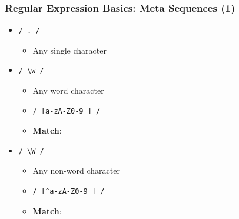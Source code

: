 \documentclass{beamer}
\begin{document}
\begin{frame}[fragile]
    \frametitle{Regular Expression Basics: Meta Sequences (1)}
    \begin{itemize}
        \item \begin{verbatim}/ . /\end{verbatim}
        \begin{itemize}
            \item Any single character
        \end{itemize}
        \item \begin{verbatim}/ \w /\end{verbatim}
        \begin{itemize}
            \item Any word character
            \item \begin{verbatim}/ [a-zA-Z0-9_] /\end{verbatim}
            \item \textbf{Match}: \texttt{\colorbox{blue!50}{}\colorbox{red!90}{\makebox[1em]{\strut}}\colorbox{blue!50}{}\colorbox{red!90}{\makebox[1em]{\strut}}\colorbox{blue!50}{}\colorbox{red!90}{\makebox[1em]{\strut}}\colorbox{red!90}{\makebox{\strut \$!-:;}}}
        \end{itemize}
        \item \begin{verbatim}/ \W /\end{verbatim}
        \begin{itemize}
            \item Any non-word character
            \item \begin{verbatim}/ [^a-zA-Z0-9_] /\end{verbatim}
            \item \textbf{Match}: \texttt{\colorbox{red!90}{}\colorbox{blue!50}{\makebox[1em]{\strut}}\colorbox{red!90}{}\colorbox{blue!50}{\makebox[1em]{\strut}}\colorbox{red!90}{}\colorbox{blue!50}{\makebox[1em]{\strut}}\colorbox{blue!50}{\makebox{\strut \$!-:;}}}
        \end{itemize}
    \end{itemize}
\end{frame}
\end{document}
